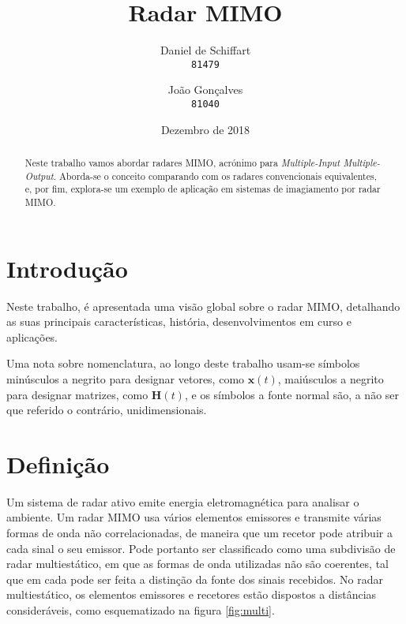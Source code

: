 \documentclass[purist,portuguese]{ist-report}
\author{Daniel de Schiffart \\ \texttt{81479} \and João Gonçalves \\ \texttt{81040}}
\title{Radar MIMO}
\subtitle{}
\date{Dezembro de 2018}
\begin{document}
\makecover


{ \tableofcontents}

\newpage

\begin{abstract}
  Neste trabalho vamos abordar radares MIMO, acrónimo para \textit{Multiple-Input Multiple-Output}. Aborda-se o conceito comparando com os radares convencionais equivalentes, e, por fim, explora-se um exemplo de aplicação em sistemas de imagiamento por radar MIMO.
\end{abstract}

\section{Introdução}


Neste trabalho, é apresentada uma visão global sobre o radar MIMO, detalhando as suas principais características, história, desenvolvimentos em curso e aplicações.

Uma nota sobre nomenclatura, ao longo deste trabalho usam-se símbolos minúsculos a negrito para designar vetores, como $\mathbf{x}(t)$, maiúsculos a negrito para designar matrizes, como $\mathbf{H}(t)$, e os símbolos a fonte normal são, a não ser que referido o contrário, unidimensionais.

\section{Definição}

Um sistema de radar ativo emite energia eletromagnética para analisar o ambiente.
Um radar MIMO usa vários elementos emissores e transmite várias formas de onda não correlacionadas, de maneira que um recetor pode atribuir a cada sinal o seu emissor. 
Pode portanto ser classificado como uma subdivisão de radar multiestático, em que as formas de onda utilizadas não são coerentes, tal que em cada pode ser feita a distinção da fonte dos sinais recebidos.
No radar multiestático, os elementos emissores e recetores estão dispostos a distâncias consideráveis, como esquematizado na figura \ref{fig:multi}.
\end{document}
